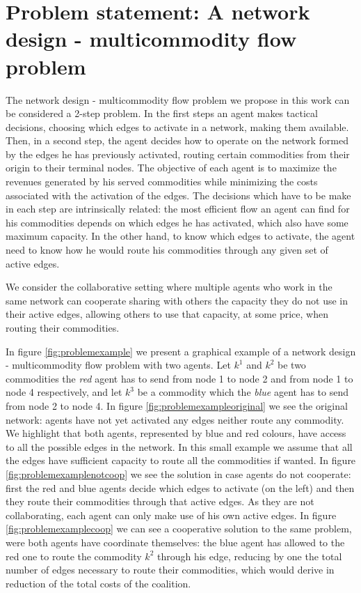 \documentclass{article}
\begin{document}
\section{Problem statement: A network design - multicommodity flow problem}\label{seq:probdefinition} 

The network design - multicommodity flow problem we propose in this work can be considered a 2-step problem. In the first steps an agent makes tactical decisions, choosing which edges to activate in a network, making them available. Then, in a second step, the agent decides how to operate on the network formed by the edges he has previously activated, routing certain commodities from their origin to their terminal nodes.
The objective of each agent is to maximize the revenues generated by his served commodities while minimizing the costs associated with the activation of the edges.
The decisions which have to be make in each step are intrinsically related: the most efficient flow an agent can find for his commodities depends on which edges he has activated, which also have some maximum capacity. In the other hand, to know which edges to activate, the agent need to know how he would route his commodities through any given set of active edges. 

We consider the collaborative setting where multiple agents who work in the same network can cooperate sharing with others the capacity they do not use in their active edges, allowing others to use that capacity, at some price, when routing their commodities.

In figure \ref{fig:problemexample} we present a graphical example of a network design - multicommodity flow problem with two agents. Let $k^1$ and $k^2$ be two commodities the \emph{red} agent has to send from node 1 to node 2 and from node 1 to node 4 respectively, and let $k^3$ be a commodity which the \emph{blue} agent has to send from node 2 to node 4. In figure \ref{fig:problemexampleoriginal} we see the original network: agents have not yet activated any edges neither route any commodity. We highlight that both agents, represented by blue and red colours, have access to all the possible edges in the network. In this small example we assume that all the edges have sufficient capacity to route all the commodities if wanted. In figure \ref{fig:problemexamplenotcoop} we see the solution in case agents do not cooperate: first the red and blue agents decide which edges to activate (on the left) and then they route their commodities through that active edges. As they are not collaborating, each agent can only make use of his own active edges. In figure \ref{fig:problemexamplecoop} we can see a cooperative solution to the same problem, were both agents have coordinate themselves: the blue agent has allowed to the red one to route the commodity $k^2$ through his edge, reducing by one the total number of edges necessary to route their commodities, which would derive in reduction of the total costs of the coalition.
\end{document}
